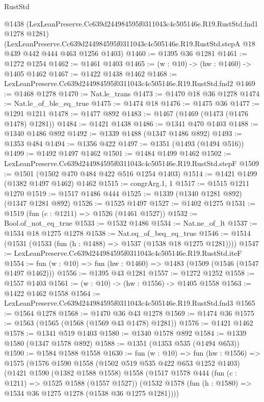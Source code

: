 \begin{lexlean}{RustStd}
\begin{coremodule}
    @1438
    (LexLeanPreserve.Cc639d244984595f0311043c4c505146e.R19.RustStd.fnd1 @1278 @1281)
    (LexLeanPreserve.Cc639d244984595f0311043c4c505146e.R19.RustStd.stepA
      @18
      @439
      @442
      @444
      @463
      @1256
      @1403)
@1460 := @1395 @36 @1281
@1461 := @1272 @1254
@1462 := @1461 @1403
@1465 := (w : @10) -> (hw : @1460) -> @1405 @1462
@1467 := @1422 @1438 @1462
@1468 := LexLeanPreserve.Cc639d244984595f0311043c4c505146e.R19.RustStd.fnd2
@1469 := @1468 @1278
@1470 := Nat.le_trans
@1473 := @1470 @18 @36 @1278
@1474 := Nat.le_of_ble_eq_true
@1475 := @1474 @18
@1476 := @1475 @36
@1477 := @1291 @1211
@1478 := @1477 @892
@1483 := @1467 (@1469 (@1473 (@1476 @1478) @1281))
@1484 := @1421 @1438
@1486 := @1341 @470 @1403
@1488 := @1340 @1486 @892
@1492 := @1339 @1488 (@1347 @1486 @892)
@1493 := @1353 @484
@1494 := @1356 @422
@1497 := @1351 (@1493 (@1494 @516))
@1499 := @1492 @1497 @1462
@1501 := @1484 @1499 @1462
@1502 := LexLeanPreserve.Cc639d244984595f0311043c4c505146e.R19.RustStd.stepF
@1509 := @1501 (@1502 @470 @484 @422 @516 @1254 @1403)
@1514 := @1421 @1499 (@1382 @1497 @1462) @1462
@1515 := congrArg.{1, 1}
@1517 := @1515 @1211 @1270
@1519 := @1517 @1486 @444
@1525 := @1339 (@1340 @1281 @892) (@1347 @1281 @892)
@1526 := @1525 @1497
@1527 := @1402 @1275
@1531 := @1519 (fun (c : @1211) => @1526 (@1461 @1527))
@1532 := Bool.of_not_eq_true
@1533 := @1532 @1486
@1534 := Nat.ne_of_lt
@1537 := @1534 @18 @1275 @1278
@1538 := Nat.eq_of_beq_eq_true
@1546 := @1514 (@1531 (@1533 (fun (h : @1488) => @1537 (@1538 @18 @1275 @1281))))
@1547 := LexLeanPreserve.Cc639d244984595f0311043c4c505146e.R19.RustStd.iteF
@1554 := fun (w : @10) => fun (hw : @1460) => @1483 (@1509 (@1546 (@1547 @1497 @1462)))
@1556 := @1395 @43 @1281
@1557 := @1272 @1252
@1558 := @1557 @1403
@1561 := (w : @10) -> (hw : @1556) -> @1405 @1558
@1563 := @1422 @1462 @1558
@1564 := LexLeanPreserve.Cc639d244984595f0311043c4c505146e.R19.RustStd.fnd3
@1565 := @1564 @1278
@1568 := @1470 @36 @43 @1278
@1569 := @1474 @36
@1575 := @1563 (@1565 (@1568 (@1569 @43 @1478) @1281))
@1576 := @1421 @1462
@1578 := @1341 @519 @1403
@1580 := @1340 @1578 @892
@1584 := @1339 @1580 (@1347 @1578 @892)
@1588 := @1351 (@1353 @535 (@1494 @653))
@1590 := @1584 @1588 @1558
@1630 := fun (w : @10) =>
  fun (hw : @1556) =>
  @1575
    (@1576
      @1590
      @1558
      (@1502 @519 @535 @422 @653 @1252 @1403)
      (@1421
        @1590
        (@1382 @1588 @1558)
        @1558
        (@1517
          @1578
          @444
          (fun (c : @1211) => @1525 @1588 (@1557 @1527))
          (@1532 @1578 (fun (h : @1580) => @1534 @36 @1275 @1278 (@1538 @36 @1275 @1281))))

\end{coremodule}
\end{lexlean}

